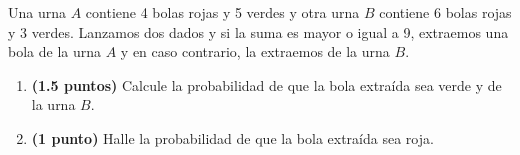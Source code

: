 
Una urna $A$ contiene 4 bolas rojas y 5 verdes y otra urna $B$ contiene
6 bolas rojas y 3 verdes. Lanzamos dos dados y si la suma es mayor o igual
a 9, extraemos una bola de la urna $A$ y en caso contrario, la extraemos
de la urna $B$.
\begin{enumerate}[label=\alph*)]
  \item \textbf{(1.5 puntos)} Calcule la probabilidad de que la bola extraída
  sea verde y de la urna $B$.
  \item \textbf{(1 punto)} Halle la probabilidad de que la bola extraída
  sea roja.
\end{enumerate}
